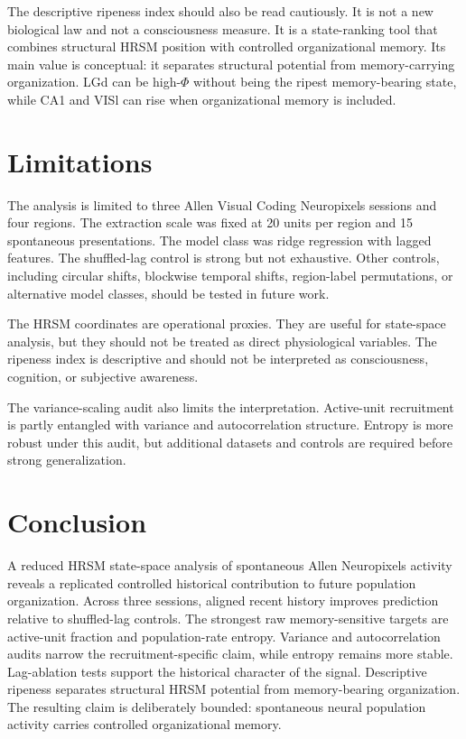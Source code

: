 \documentclass[11pt]{article}
\begin{document}
The descriptive ripeness index should also be read cautiously. It is not a new biological law and not a consciousness measure. It is a state-ranking tool that combines structural HRSM position with controlled organizational memory. Its main value is conceptual: it separates structural potential from memory-carrying organization. LGd can be high-\(\Phi\) without being the ripest memory-bearing state, while CA1 and VISl can rise when organizational memory is included.

\section{Limitations}

The analysis is limited to three Allen Visual Coding Neuropixels sessions and four regions. The extraction scale was fixed at 20 units per region and 15 spontaneous presentations. The model class was ridge regression with lagged features. The shuffled-lag control is strong but not exhaustive. Other controls, including circular shifts, blockwise temporal shifts, region-label permutations, or alternative model classes, should be tested in future work.

The HRSM coordinates are operational proxies. They are useful for state-space analysis, but they should not be treated as direct physiological variables. The ripeness index is descriptive and should not be interpreted as consciousness, cognition, or subjective awareness.

The variance-scaling audit also limits the interpretation. Active-unit recruitment is partly entangled with variance and autocorrelation structure. Entropy is more robust under this audit, but additional datasets and controls are required before strong generalization.

\section{Conclusion}

A reduced HRSM state-space analysis of spontaneous Allen Neuropixels activity reveals a replicated controlled historical contribution to future population organization. Across three sessions, aligned recent history improves prediction relative to shuffled-lag controls. The strongest raw memory-sensitive targets are active-unit fraction and population-rate entropy. Variance and autocorrelation audits narrow the recruitment-specific claim, while entropy remains more stable. Lag-ablation tests support the historical character of the signal. Descriptive ripeness separates structural HRSM potential from memory-bearing organization. The resulting claim is deliberately bounded: spontaneous neural population activity carries controlled organizational memory.
\end{document}
